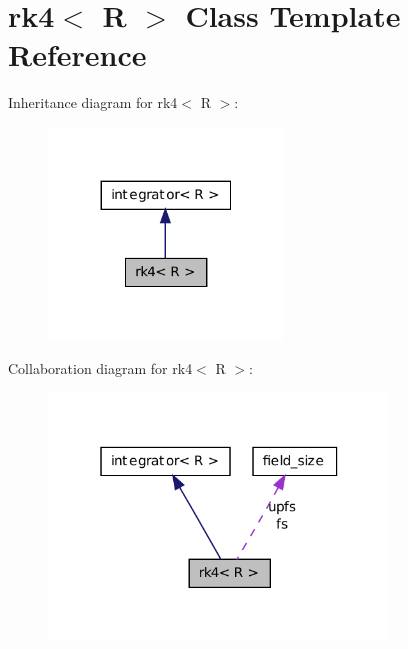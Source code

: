 \hypertarget{classrk4}{
\section{rk4$<$ R $>$ Class Template Reference}
\label{classrk4}
}


Inheritance diagram for rk4$<$ R $>$:
\nopagebreak
\begin{figure}[H]
\begin{center}
\leavevmode
\includegraphics[width=176pt]{classrk4__inherit__graph}
\end{center}
\end{figure}


Collaboration diagram for rk4$<$ R $>$:
\nopagebreak
\begin{figure}[H]
\begin{center}
\leavevmode
\includegraphics[width=256pt]{classrk4__coll__graph}
\end{center}
\end{figure}
